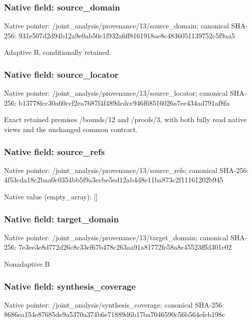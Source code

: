 \documentclass[10pt,a4paper]{article}
\begin{document}
\subsubsection{Native field: source\_\allowbreak{}domain}
Native pointer: /joint\_\allowbreak{}analysis/provenance/13/source\_\allowbreak{}domain; canonical SHA-256: 931e507d2d94b12a9e0ab50c1f932a6ff8161918ae8c4836051139752c5f9aa5

\begingroup\raggedright\sloppy Adaptive B,\allowbreak{} conditionally retained.\par\endgroup

\subsubsection{Native field: source\_\allowbreak{}locator}
Native pointer: /joint\_\allowbreak{}analysis/provenance/13/source\_\allowbreak{}locator; canonical SHA-256: b13778fcc30a60ccf2ea7687f4f489dcdcc946f68516026a7ee434ad791af8fa

\begingroup\raggedright\sloppy Exact retained premises /\allowbreak{}bounds/\allowbreak{}12 and /\allowbreak{}proofs/\allowbreak{}3,\allowbreak{} with both fully read native views and the unchanged common contract.\par\endgroup

\subsubsection{Native field: source\_\allowbreak{}refs}
Native pointer: /joint\_\allowbreak{}analysis/provenance/13/source\_\allowbreak{}refs; canonical SHA-256: 4f53cda18c2baa0c0354bb5f9a3ecbe5ed12ab4d8e11ba873c2f11161202b945

Native value (empty\_\allowbreak{}array): []

\subsubsection{Native field: target\_\allowbreak{}domain}
Native pointer: /joint\_\allowbreak{}analysis/provenance/13/target\_\allowbreak{}domain; canonical SHA-256: 7e3ee3e8d772d26c8c33ef67b478c263aa91a81772fe58a8e45523fffd301c02

\begingroup\raggedright\sloppy Nonadaptive B\par\endgroup

\subsubsection{Native field: synthesis\_\allowbreak{}coverage}
Native pointer: /joint\_\allowbreak{}analysis/synthesis\_\allowbreak{}coverage; canonical SHA-256: 8686ea154e87685de9a5370a374b6e71889d6b17ba7046590c56b564efeb198c
\end{document}
